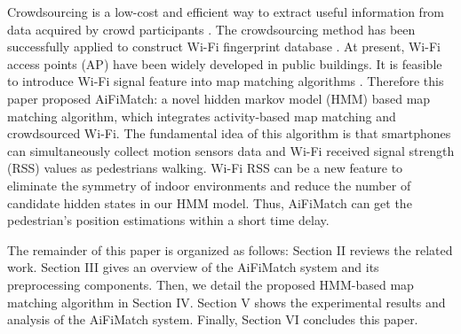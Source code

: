 \documentclass{llncs}
\begin{document}
Crowdsourcing is a low-cost and efficient way to extract useful information from data acquired by crowd participants \cite{wang2016indoor}. The crowdsourcing method has been successfully applied to construct Wi-Fi fingerprint database \cite{zhang2014robust,xiang2017tack}. At present, Wi-Fi access points (AP) have been widely developed in public buildings. It is feasible to introduce Wi-Fi signal feature into map matching algorithms \cite{newson2009hidden,seitz2010hidden}. Therefore this paper proposed AiFiMatch: a novel hidden markov model (HMM) based map matching algorithm, which integrates activity-based map matching and crowdsourced Wi-Fi. The fundamental idea of this algorithm is that smartphones can simultaneously collect motion sensors data and Wi-Fi received signal strength (RSS) values as pedestrians walking. Wi-Fi RSS can be a new feature to eliminate the symmetry of indoor environments and reduce the number of candidate hidden states in our HMM model. Thus, AiFiMatch can get the pedestrian's position estimations within a short time delay. 



The remainder of this paper is organized as follows: Section II reviews the related work. Section III gives an overview of the AiFiMatch system and its preprocessing components. Then, we detail the proposed HMM-based map matching algorithm in Section IV. Section V shows the experimental results and analysis of the AiFiMatch system. Finally, Section VI concludes this paper.
\end{document}
